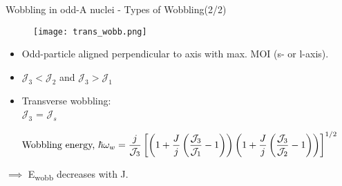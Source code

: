\documentclass [aspectratio=169]{beamer}
\begin{document}
\begin{frame}{Wobbling in odd-A nuclei - Types of Wobbling(2/2)}
\begin{multicols}{2}
\begin{figure}
\begin{center}
\texttt{[image: trans\_wobb.png]}
\hspace{8pt}
\end{center}
\end{figure}
\begin{itemize}
\item{Odd-particle aligned perpendicular to axis with max. MOI (s- or l-axis).}
\item{$\mathcal{J}_{3} < \mathcal{J}_{2}$ and $\mathcal{J}_{3} > \mathcal{J}_{1}$}
\item{Transverse wobbling: \\ $\mathcal{J}_{3}$ = $\mathcal{J}_{s}$} 
\end{itemize}
\end{multicols}
\begin{align*}
\begin{centering}
\text{Wobbling energy, } \hbar \omega_{w} = \frac{j}{\mathcal{J}_{3}} \left[\left(1+ \frac{J}{j} \left( \frac{\mathcal{J}_{3}}{\mathcal{J}_{1}} -1 \right) \right) \left( 1+ \frac{J}{j} \left( \frac{\mathcal{J}_{3}}{\mathcal{J}_{2}} -1 \right)\right)\right]^{1/2}
\end{centering}
\end{align*}

$\implies$ E\textsubscript{wobb} decreases with J.
\begin{center}
\end{center}
\end{frame}
\end{document}
